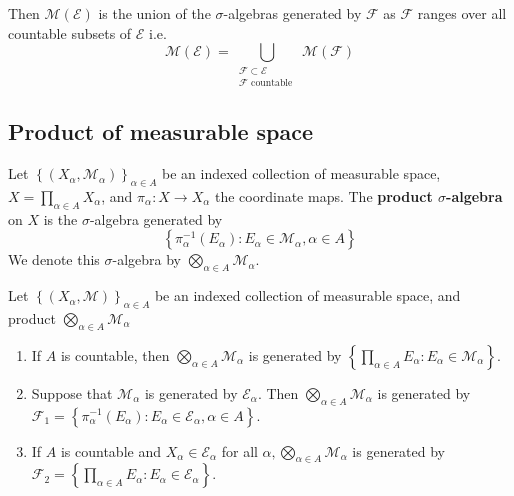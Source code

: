 \documentclass[12pt, a4paper, oneside]{book}
\begin{document}
\begin{proposition}
    Then $\mathcal{M}\left(\mathcal{E}\right)$ is the union of the $\sigma$-algebras generated by $\mathcal{F}$ as $\mathcal{F}$ ranges over all countable subsets of $\mathcal{E}$ i.e.
    \begin{equation*}
        \mathcal{M}\left(\mathcal{E}\right)
        =
        \bigcup_{\substack{\mathcal{F}\subset \mathcal{E} \\ \mathcal{F} \text{ countable }}}
        \mathcal{M}\left(\mathcal{F}\right)
    \end{equation*}
\end{proposition}


\subsection{Product of measurable space} %
\begin{definition}
    Let $\left\{\left(X_\alpha,\mathcal{M}_\alpha\right)\right\}_{\alpha \in A}$ be an indexed collection of measurable space, $X=\prod_{\alpha \in A} X_\alpha$, and $\pi_\alpha: X \rightarrow X_\alpha$ the coordinate maps.
    The \textbf{product $\sigma$-algebra} on $X$ is the $\sigma$-algebra generated by
    \begin{equation*}
        \left\{\pi_\alpha^{-1}\left(E_\alpha\right): E_\alpha \in \mathcal{M}_\alpha, \alpha \in A\right\}
    \end{equation*}
    We denote this $\sigma$-algebra by $\bigotimes_{\alpha \in A} \mathcal{M}_\alpha$.
\end{definition}


\begin{proposition}
    \label{pro: Product of measurable space}
    Let $\left\{\left(X_\alpha,\mathcal{M}\right)\right\}_{\alpha \in A}$ be an indexed collection of measurable space, and product $\bigotimes_{\alpha \in A} \mathcal{M}_\alpha$
    \begin{enumerate}
        \item
              If $A$ is countable, then $\bigotimes_{\alpha \in A} \mathcal{M}_\alpha$ is generated by $\left\{\prod_{\alpha \in A} E_\alpha: E_\alpha \in \mathcal{M}_\alpha\right\}$.
        \item
              Suppose that $\mathcal{M}_\alpha$ is generated by $\mathcal{E}_\alpha$. Then $\bigotimes_{\alpha \in A} \mathcal{M}_\alpha$ is generated by $\mathcal{F}_1=\left\{\pi_\alpha^{-1}\left(E_\alpha\right): E_\alpha \in \mathcal{E}_\alpha, \alpha \in A\right\}$.
        \item
              If $A$ is countable and $X_\alpha \in \mathcal{E}_\alpha$ for all $\alpha, \bigotimes_{\alpha \in A} \mathcal{M}_\alpha$ is generated by $\mathcal{F}_2=\left\{\prod_{\alpha \in A} E_\alpha: E_\alpha \in \mathcal{E}_\alpha\right\}$.
    \end{enumerate}
\end{proposition}
\end{document}
